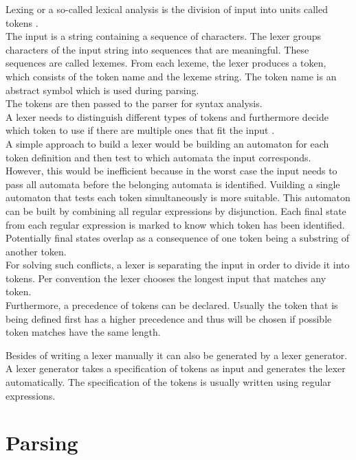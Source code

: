 Lexing or a so-called lexical analysis is the division of input into units called tokens \cite{LexYacc.1992}.\\
The input is a string containing a sequence of characters.
The lexer groups characters of the input string into sequences that are meaningful. These sequences are called lexemes. From each lexeme, the lexer produces a token, which consists of the token name and the lexeme string. The token name is an abstract symbol which is used during parsing. \cite{Aho.2007} \\
The tokens are then passed to the parser for syntax analysis.\\
A lexer needs to distinguish different types of tokens and furthermore decide which token to use if there are multiple ones that fit the input \cite{Mogensen.2017}.\\
A simple approach to build a lexer would be building an automaton for each token definition and then test to which automata the input corresponds.\\
However, this would be inefficient because in the worst case the input needs to pass all automata before the belonging automata is identified.
Vuilding a single automaton that tests each token simultaneously is more suitable.
This automaton can be built by combining all regular expressions by disjunction.
Each final state from each regular expression is marked to know which token has been identified.\\
Potentially final states overlap as a consequence of one token being a substring of another token. \\
For solving such conflicts, a lexer is separating the input in order to divide it into tokens.
Per convention the lexer chooses the longest input that matches any token. \cite{Mogensen.2017} \\
Furthermore, a precedence of tokens can be declared. Usually the token that is being defined first has a higher precedence and thus will be chosen if possible token matches have the same length. \cite{Mogensen.2017}

Besides of writing a lexer manually it can also be generated by a lexer generator.
A lexer generator takes a specification of tokens as input and generates the lexer automatically. 
The specification of the tokens is usually written using regular expressions. 

\section{Parsing}\label{sec:BackgroundParser}

